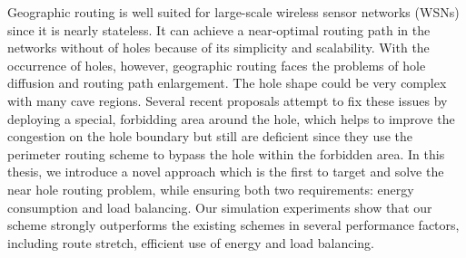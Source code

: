 \begin{abstractsEnglish}         
Geographic routing is well suited for large-scale wireless sensor networks (WSNs) since it is nearly stateless. It can achieve a near-optimal routing path in the networks without of holes because of its simplicity and scalability. With the occurrence of holes, however, geographic routing faces the problems of hole diffusion and routing path enlargement. The hole shape could be very complex with many cave regions. Several recent proposals attempt to fix these issues by deploying a special, forbidding area around the hole, which helps to improve the congestion on the hole boundary but still are deficient since they use the perimeter routing scheme to bypass the hole within the forbidden area. In this thesis, we introduce a novel approach which is the first to target and solve the near hole routing problem, while ensuring both two requirements: energy consumption and load balancing. Our simulation experiments show that our scheme strongly outperforms the existing schemes in several performance factors, including route stretch, efficient use of energy and load balancing.
\end{abstractsEnglish}
 
